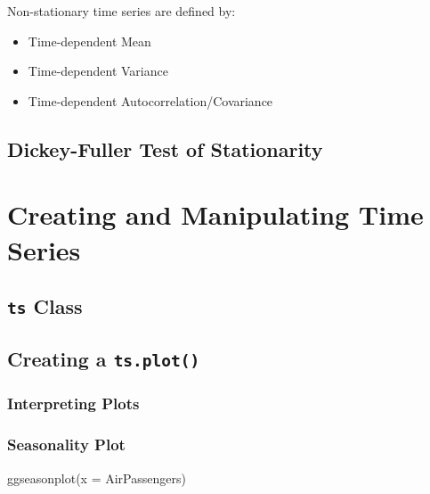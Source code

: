 \documentclass[
]{book}
\newenvironment{Shaded}{\begin{snugshade}}{\end{snugshade}}
\newcommand{\AttributeTok}[1]{\textcolor[rgb]{0.77,0.63,0.00}{#1}}
\newcommand{\FunctionTok}[1]{\textcolor[rgb]{0.00,0.00,0.00}{#1}}
\newcommand{\NormalTok}[1]{#1}
\providecommand{\tightlist}{%
  \setlength{\itemsep}{0pt}\setlength{\parskip}{0pt}}
\begin{document}
Non-stationary time series are defined by:

\begin{itemize}
\tightlist
\item
  Time-dependent Mean
\item
  Time-dependent Variance
\item
  Time-dependent Autocorrelation/Covariance
\end{itemize}

\hypertarget{dickey-fuller-test-of-stationarity}{%
\section{Dickey-Fuller Test of Stationarity}\label{dickey-fuller-test-of-stationarity}}

\hypertarget{creating-and-manipulating-time-series}{%
\chapter{Creating and Manipulating Time Series}\label{creating-and-manipulating-time-series}}

\hypertarget{ts-class}{%
\section{\texorpdfstring{\texttt{ts} Class}{ts Class}}\label{ts-class}}

\hypertarget{creating-a-ts.plot}{%
\section{\texorpdfstring{Creating a \texttt{ts.plot()}}{Creating a ts.plot()}}\label{creating-a-ts.plot}}

\hypertarget{interpreting-plots}{%
\subsection{Interpreting Plots}\label{interpreting-plots}}

\hypertarget{seasonality-plot}{%
\subsection{Seasonality Plot}\label{seasonality-plot}}

\begin{Shaded}
\begin{Highlighting}[]
\FunctionTok{ggseasonplot}\NormalTok{(}\AttributeTok{x =}\NormalTok{ AirPassengers)}
\end{Highlighting}
\end{Shaded}
\end{document}
